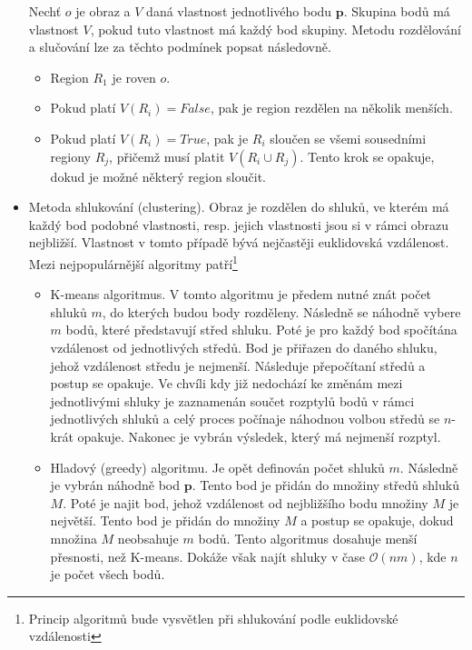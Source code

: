 \documentclass[twoside]{ctuthesis}
\newcommand{\tl}[1]{$\mathbf{#1}$}
\begin{document}
\begin{itemize}
    Nechť $o$ je obraz a $V$ daná vlastnost jednotlivého bodu \tl{p}. Skupina bodů má vlastnost $V$, pokud tuto vlastnost má každý bod skupiny. Metodu rozdělování a slučování lze za těchto podmínek popsat následovně.\cite{segmentace_metody}
    \begin{itemize}
        \item Region $R_1$ je roven $o$.
        \item Pokud platí $V(R_i) = False$, pak je region rezdělen na několik menších.
        \item Pokud platí $V(R_i) = True$, pak je $R_i$ sloučen se všemi sousedními regiony $R_j$, přičemž musí platit $V(R_i \cup R_j)$. Tento krok se opakuje, dokud je možné některý region sloučit.
    \end{itemize}         %
\item Metoda shlukování (clustering). Obraz je rozdělen do shluků, ve kterém má každý bod podobné vlastnosti, resp. jejich vlastnosti jsou si v rámci obrazu nejbližší. Vlastnost v tomto případě bývá nejčastěji euklidovská vzdálenost. Mezi nejpopulárnější algoritmy patří\footnote{Princip algoritmů bude vysvětlen při shlukování podle euklidovské vzdálenosti}
    \begin{itemize}
        \item K-means algoritmus. V tomto algoritmu je předem nutné znát počet shluků $m$, do kterých budou body rozděleny. Následně se náhodně vybere $m$ bodů, které představují střed shluku. Poté je pro každý bod spočítána vzdálenost od jednotlivých středů. Bod je přiřazen do daného shluku, jehož vzdálenost středu je nejmenší. Následuje přepočítaní středů a postup se opakuje. Ve chvíli kdy již nedochází ke změnám mezi jednotlivými shluky je zaznamenán součet rozptylů bodů v rámci jednotlivých shluků a celý proces počínaje náhodnou volbou středů se $n$-krát opakuje. Nakonec je vybrán výsledek, který má nejmenší rozptyl.\cite{kmeans_seg}
        \item Hladový (greedy) algoritmu. Je opět definován počet shluků $m$. Následně je vybrán náhodně bod \tl{p}. Tento bod je přidán do množiny středů shluků $M$. Poté je najit bod, jehož vzdálenost od nejbližšího bodu množiny $M$ je největší. Tento bod je přidán do množiny $M$ a postup se opakuje, dokud množina $M$ neobsahuje $m$ bodů. Tento algoritmus dosahuje menší přesnosti, než K-means. Dokáže však najít shluky v čase $\mathcal{O}(nm)$, kde $n$ je počet všech bodů. \cite{trevor2013efficient, rusu2009close}

\end{itemize}
\end{itemize}
\end{document}
